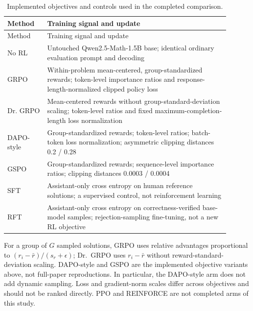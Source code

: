 \begingroup\footnotesize\setlength{\tabcolsep}{3pt}
\begin{longtable}{>{\raggedright\arraybackslash}p{0.1620\linewidth}>{\raggedright\arraybackslash}p{0.7380\linewidth}}
\caption{Implemented objectives and controls used in the completed comparison.}\\
\toprule Method & Training signal and update \\
\midrule\endfirsthead
\toprule Method & Training signal and update \\
\midrule\endhead
\midrule\multicolumn{2}{r}{Continued on next page}\endfoot
\bottomrule\endlastfoot
No RL & Untouched Qwen2.5-Math-1.5B base; identical ordinary evaluation prompt and decoding \\
GRPO & Within-problem mean-centered, group-standardized rewards; token-level importance ratios and response-length-normalized clipped policy loss \\
Dr. GRPO & Mean-centered rewards without group-standard-deviation scaling; token-level ratios and fixed maximum-completion-length loss normalization \\
DAPO-style & Group-standardized rewards; token-level ratios; batch-token loss normalization; asymmetric clipping distances 0.2 /\allowbreak{} 0.28 \\
GSPO & Group-standardized rewards; sequence-level importance ratios; clipping distances 0.0003 /\allowbreak{} 0.0004 \\
SFT & Assistant-only cross entropy on human reference solutions; a supervised control, not reinforcement learning \\
RFT & Assistant-only cross entropy on correctness-verified base-model samples; rejection-sampling fine-tuning, not a new RL objective \\
\end{longtable}\endgroup


For a group of $G$ sampled solutions, GRPO uses relative advantages proportional to $(r_i-\bar r)/(s_r+\epsilon)$; Dr.~GRPO uses $r_i-\bar r$ without reward-standard-deviation scaling. DAPO-style and GSPO are the implemented objective variants above, not full-paper reproductions. In particular, the DAPO-style arm does not add dynamic sampling. Loss and gradient-norm scales differ across objectives and should not be ranked directly. PPO and REINFORCE are not completed arms of this study.

